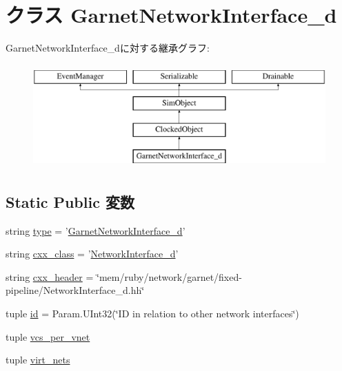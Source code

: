 \hypertarget{classGarnetNetwork__d_1_1GarnetNetworkInterface__d}{
\section{クラス GarnetNetworkInterface\_\-d}
\label{classGarnetNetwork__d_1_1GarnetNetworkInterface__d}
}
GarnetNetworkInterface\_\-dに対する継承グラフ:\begin{figure}[H]
\begin{center}
\leavevmode
\includegraphics[height=4cm]{classGarnetNetwork__d_1_1GarnetNetworkInterface__d}
\end{center}
\end{figure}
\subsection*{Static Public 変数}
\begin{DoxyCompactItemize}
\item 
string \hyperlink{classGarnetNetwork__d_1_1GarnetNetworkInterface__d_acce15679d830831b0bbe8ebc2a60b2ca}{type} = '\hyperlink{classGarnetNetwork__d_1_1GarnetNetworkInterface__d}{GarnetNetworkInterface\_\-d}'
\item 
string \hyperlink{classGarnetNetwork__d_1_1GarnetNetworkInterface__d_a58cd55cd4023648e138237cfc0822ae3}{cxx\_\-class} = '\hyperlink{classNetworkInterface__d}{NetworkInterface\_\-d}'
\item 
string \hyperlink{classGarnetNetwork__d_1_1GarnetNetworkInterface__d_a17da7064bc5c518791f0c891eff05fda}{cxx\_\-header} = \char`\"{}mem/ruby/network/garnet/fixed-\/pipeline/NetworkInterface\_\-d.hh\char`\"{}
\item 
tuple \hyperlink{classGarnetNetwork__d_1_1GarnetNetworkInterface__d_a0e43f6071072440917ee2dd8af07d251}{id} = Param.UInt32(\char`\"{}ID in relation to other network interfaces\char`\"{})
\item 
tuple \hyperlink{classGarnetNetwork__d_1_1GarnetNetworkInterface__d_a2bb2221cda9b94b6a0c2944d8a12f31e}{vcs\_\-per\_\-vnet}
\item 
tuple \hyperlink{classGarnetNetwork__d_1_1GarnetNetworkInterface__d_a84c7a415611bc1b55aa5e7fd9e9601e8}{virt\_\-nets}
\end{DoxyCompactItemize}


